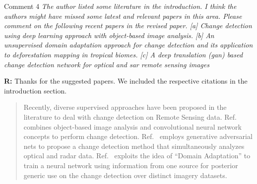 \documentclass[11pt]{report}
\begin{document}
\medskip
\begin{mybox}{Comment 4}
\textit{The author listed some literature in the introduction. I think the authors might have missed some latest and relevant papers in this area. Please comment on the following recent papers in the revised paper. [a] Change detection using deep learning approach with object-based image analysis. [b] An unsupervised domain adaptation approach for change detection and its application to deforestation mapping in tropical biomes. [c] A deep translation (gan) based change detection network for optical and sar remote sensing images}

\medskip

\textbf{R:} Thanks for the suggested papers. We included the respective citations in the introduction section.

\medskip

\begin{quotation}

Recently, diverse supervised approaches have been proposed in the literature to deal with change detection on Remote Sensing data. 
Ref.~ combines object-based image analysis and convolutional neural network concepts to perform %
change detection. %
Ref.~ employs generative adversarial nets to propose a 
change detection method that simultaneously analyzes optical and radar data. 
Ref.~ exploits the idea of ``Domain Adaptation'' to train a neural network using information from one source for posterior generic use on the change detection over distinct imagery datasets.

\end{quotation}


\end{mybox}

\vspace{0.3cm}
\end{document}
